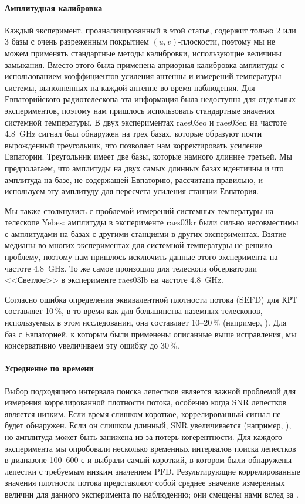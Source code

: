 \paragraph{Амплитудная калибровка}

Каждый эксперимент, проанализированный в этой статье, содержит только 2 или 3 базы с очень
разреженным покрытием $(u, v)$-плоскости, поэтому мы не можем применять стандартные методы
калибровки, использующие величины замыкания. Вместо этого была применена априорная калибровка
амплитуды с использованием коэффициентов усиления антенны и измерений температуры системы,
выполненных на каждой антенне во время наблюдения. Для Евпаторийского радиотелескопа эта информация
была недоступна для отдельных экспериментов, поэтому нам пришлось использовать стандартные значения
системной температуры. В двух экспериментах raes03eo и raes03en на частоте \SI{4.8}{\GHz} сигнал
был обнаружен на трех базах, которые образуют почти вырожденный треугольник, что позволяет
нам корректировать усиление Евпатории. Треугольник имеет две базы, которые намного длиннее
третьей. Мы предполагаем, что амплитуды на двух самых длинных базах идентичны и что
амплитуда на базе, не содержащей Евпаторию, рассчитана правильно, и используем эту
амплитуду для пересчета усиления станции Евпатория.

Мы также столкнулись с проблемой измерений системных температуры на телескопе Yebes: амплитуды в
эксперименте raes03kr были сильно несовместимы с амплитудами на базах с другими станциями в
других экспериментах. Взятие медианы во многих экспериментах для системной температуры не
решило проблему, поэтому нам пришлось исключить данные этого эксперимента на частоте \SI{4.8}{\GHz}.
То же самое произошло для телескопа обсерватории <<Светлое>> в эксперименте raes03lb на частоте
\SI{4.8}{\GHz}.

Согласно \cite{Kovalev_2014_rus} ошибка определения эквивалентной плотности потока (SEFD) для КРТ
составляет 10\,\%, в то время как для большинства наземных телескопов, используемых в этом
исследовании, она составляет 10--20\,\% (например, \cite{Bondi_1994}). Для баз с Евпаторией, к
которым были применены описанные выше исправления, мы консервативно увеличиваем эту ошибку до
30\,\%.

\paragraph{Усреднение по времени}

Выбор подходящего интервала поиска лепестков является важной проблемой для измерения
коррелированной плотности потока, особенно когда SNR лепестков является низким. Если время слишком
короткое, коррелированный сигнал не будет обнаружен. Если он слишком длинный, SNR увеличивается
(например, \cite{Clark_1968}), но амплитуда может быть занижена из-за потерь когерентности. Для
каждого эксперимента мы опробовали несколько временных интервалов поиска лепестков в диапазоне
100--600 с и выбрали самый короткий, в котором были обнаружены лепестки с требуемым низким значением
PFD. Результирующие коррелированные значения плотности потока представляют собой среднее значение
измеренных величин для данного эксперимента по наблюдению; они смещены нами вслед за
\cite{VLBIbook}.

